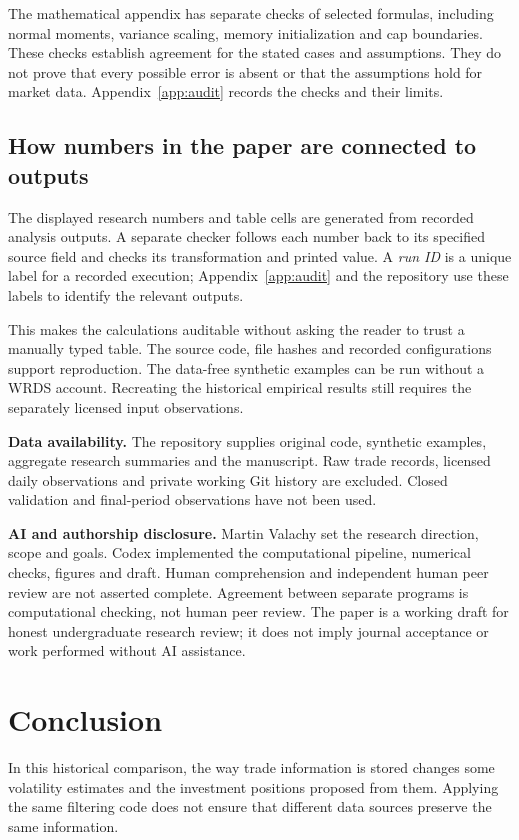 The mathematical appendix has separate checks of selected formulas, including normal moments, variance scaling, memory initialization and cap boundaries. These checks establish agreement for the stated cases and assumptions. They do not prove that every possible error is absent or that the assumptions hold for market data. Appendix~\ref{app:audit} records the checks and their limits.

\subsection{How numbers in the paper are connected to outputs}
The displayed research numbers and table cells are generated from recorded analysis outputs. A separate checker follows each number back to its specified source field and checks its transformation and printed value. A \emph{run ID} is a unique label for a recorded execution; Appendix~\ref{app:audit} and the repository use these labels to identify the relevant outputs.

This makes the calculations auditable without asking the reader to trust a manually typed table. The source code, file hashes and recorded configurations support reproduction. The data-free synthetic examples can be run without a WRDS account. Recreating the historical empirical results still requires the separately licensed input observations.

\textbf{Data availability.} The repository supplies original code, synthetic examples, aggregate research summaries and the manuscript. Raw trade records, licensed daily observations and private working Git history are excluded. Closed validation and final-period observations have not been used.

\textbf{AI and authorship disclosure.} Martin Valachy set the research direction, scope and goals. Codex implemented the computational pipeline, numerical checks, figures and draft. Human comprehension and independent human peer review are not asserted complete. Agreement between separate programs is computational checking, not human peer review. The paper is a working draft for honest undergraduate research review; it does not imply journal acceptance or work performed without AI assistance.

\section{Conclusion}
In this historical comparison, the way trade information is stored changes some volatility estimates and the investment positions proposed from them. Applying the same filtering code does not ensure that different data sources preserve the same information.

